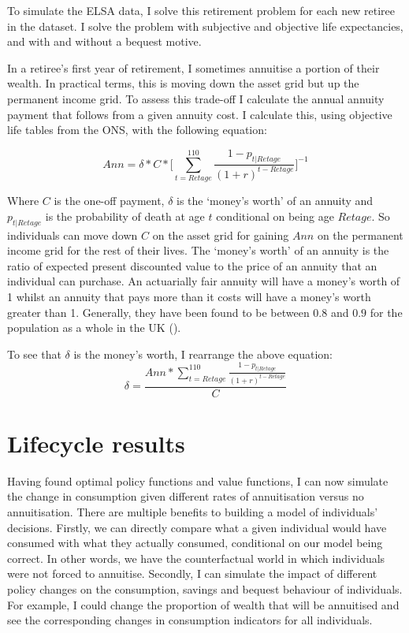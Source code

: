 \documentclass[12pt]{article}
\begin{document}
To simulate the ELSA data, I solve this retirement problem for each new retiree
in the dataset. I solve the problem with subjective and objective life
expectancies, and with and without a bequest motive.

In a retiree's first year of retirement, I sometimes annuitise a portion of
their wealth. In practical terms, this is moving down the asset grid but up the
permanent income grid. To assess this trade-off I calculate the annual annuity
payment that follows from a given annuity cost. I calculate this, using
objective life tables from the ONS, with the following equation:


\begin{equation*}
  Ann = \delta * C * \biggl[\sum_{t = Retage}^{110}\frac{1 - p_{t|Retage}}{(1 + r)^{t - Retage}}\biggr]^{-1}
\end{equation*}

Where $C$ is the one-off payment, $\delta$ is the `money's worth' of an annuity
and $p_{t|Retage}$ is the probability of death at age $t$ conditional on being
age $Retage$. So individuals can move down $C$ on the asset grid for gaining
$Ann$ on the permanent income grid for the rest of their lives. The `money's
worth' of an annuity is the ratio of expected present discounted value to the
price of an annuity that an individual can purchase. An actuarially fair annuity
will have a money's worth of 1 whilst an annuity that pays more than it costs
will have a money's worth greater than 1. Generally, they have been found to be
between $0.8$ and $0.9$ for the population as a whole in the UK
(\cite{finkelstein-porteba-2002, finkelstein-porteba-2004, mitchell-et-al-1999}).

To see that $\delta$ is the money's worth, I rearrange the above equation:
\begin{equation*}
  \delta =  \frac{Ann*\sum_{t = Retage}^{110}\frac{1 - p_{t|Retage}}{(1 + r)^{t - Retage}}}{C}
\end{equation*}

\section{Lifecycle results}

Having found optimal policy functions and value functions, I can now simulate the
change in consumption given different rates of annuitisation versus no
annuitisation. There are multiple benefits to building a model of individuals'
decisions. Firstly, we can directly compare what a given individual would have
consumed with what they actually consumed, conditional on our model being
correct. In other words, we have the counterfactual world in which individuals
were not forced to annuitise. Secondly, I can simulate the impact of different
policy changes on the consumption, savings and bequest behaviour of individuals.
For example, I could change the proportion of wealth that will be annuitised and
see the corresponding changes in consumption indicators for all individuals.
\end{document}
